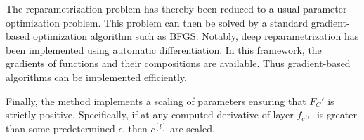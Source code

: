 The reparametrization problem has thereby been reduced to a usual parameter optimization problem. This problem can then be solved by a standard gradient-based optimization algorithm such as BFGS. Notably, deep reparametrization has been implemented using automatic differentiation. In this framework, the gradients of functions and their compositions are available. Thus gradient-based algorithms can be implemented efficiently.

Finally, the method implements a scaling of parameters ensuring that \(F_C' \) is strictly positive. Specifically, if at any computed derivative of layer  \(f_{c^[l]}\) is greater than some predetermined \(\epsilon\), then \(c^[l]\) are scaled. 
